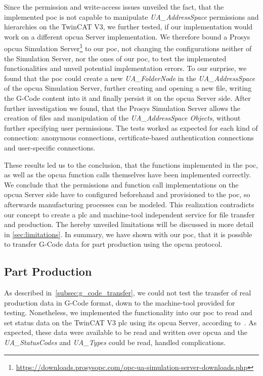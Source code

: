\documentclass[
a4paper,
twoside,
headsepline,
cleardoublepage=empty,
parskip=half,
draft=false
]{scrbook}
\begin{document}
				Since the permission and write-access issues unveiled the fact, that the implemented \gls{poc} is not capable to manipulate \textit{UA\_AddressSpace} permissions and hierarchies on the TwinCAT V3, we further tested, if our implementation would work on a different \gls{opcua} Server implementation. We therefore bound a Prosys \gls{opcua} Simulation Server\footnote{\url{https://downloads.prosysopc.com/opc-ua-simulation-server-downloads.php}} to our \gls{poc}, not changing the configurations neither of the Simulation Server, nor the ones of our \gls{poc}, to test the implemented functionalities and unveil potential implementation errors. 
				To our surprise, we found that the \gls{poc} could create a new \textit{UA\_FolderNode} in the \textit{UA\_AddressSpace} of the \gls{opcua} Simulation Server, further creating and opening a new file, writing the G-Code content into it and finally persist it on the \gls{opcua} Server side. After further investigation we found, that the Prosys Simulation Server allows the creation of files and manipulation of the \textit{UA\_AddressSpace Objects}, without further specifying user permissions. The tests worked as expected for each kind of connection: anonymous connections, certificate-based authentication connections and user-specific connections.
				
				These results led us to the conclusion, that the functions implemented in the \gls{poc}, as well as the \gls{opcua} function calls themselves have been implemented correctly. We conclude that the permissions and function call implementations on the \gls{opcua} Server side have to configured beforehand and provisioned to the \gls{poc}, so afterwards manufacturing processes can be modeled. This realization contradicts our concept to create a \gls{plc} and machine-tool independent service for file transfer and production. The hereby unveiled limitations will be discussed in more detail in \cref{sec:limitations}. 
				In summary, we have shown with our \gls{poc}, that it is possible to transfer G-Code data for part production using the \gls{opcua} protocol.

			\subsection{Part Production}\label{subsec:part_production}

				As described in~\cref{subsec:g_code_transfer}, we could not test the transfer of real production data in G-Code format, down to the machine-tool provided for testing. 
				Nonetheless, we implemented the functionality into our \gls{poc} to read and set status data on the TwinCAT V3 \gls{plc} using its \gls{opcua} Server, according to~\cite{twincat2018}.
				As expected, these data were available to be read and written over \gls{opcua} and the \textit{UA\_StatusCodes} and \textit{UA\_Types} could be read, handled complications.
				
\end{document}

